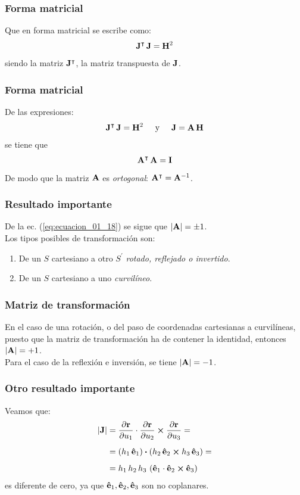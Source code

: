 \documentclass[12pt]{beamer}
\begin{document}
\begin{frame}
\frametitle{Forma matricial}
Que en forma matricial se escribe como:
\pause
\begin{align*}
\vb{J}^{\intercal} \, \vb{J} = \vb{H}^{2}
\end{align*}
siendo la matriz $\vb{J}^{\intercal}$, la matriz transpuesta de $\vb{J}$.
\end{frame}
\begin{frame}
\frametitle{Forma matricial}
De las expresiones:
\pause
\begin{align*}
\vb{J}^{\intercal} \, \vb{J} = \vb{H}^{2} \hspace{0.5cm} \mbox{y} \hspace{0.5cm} \vb{J} = \vb{A} \, \vb{H}
\end{align*}
se tiene que
\begin{align}
\vb{A}^{\intercal} \, \vb{A} = \vb{I}
\label{eq:ecuacion_01_18}
\end{align}
\pause
De modo que la matriz $\vb{A}$ es \emph{ortogonal}: $\vb{A}^{\intercal} = \vb{A}^{-1}$.
\end{frame}
\begin{frame}
\frametitle{Resultado importante}
De la ec. (\ref{eq:ecuacion_01_18}) se sigue que $\abs{\vb{A}} = \pm 1$.
\\
\bigskip
\pause
Los tipos posibles de transformación son:
\begin{enumerate}[<+->]
\item De un $S$ cartesiano a otro $S^{\prime}$ \emph{rotado, reflejado o invertido}.
\item De un $S$ cartesiano a uno \emph{curvilíneo}.
\end{enumerate}
\end{frame}
\begin{frame}
\frametitle{Matriz de transformación}
En el caso de una rotación, o del paso de coordenadas cartesianas a curvilíneas, puesto que la matriz de transformación ha de contener la identidad, entonces $\abs{\vb{A}} = +1$.
\\
\bigskip
\pause
Para el caso de la reflexión e inversión, se tiene $\abs{\vb{A}} = -1$.
\end{frame}
\begin{frame}
\frametitle{Otro resultado importante}
Veamos que:
\pause
\begin{align*}
\abs{\vb{J}} &= \pdv{\vb{r}}{u_{1}} \cdot \pdv{\vb{r}}{u_{2}} \cp \pdv{\vb{r}}{u_{3}} = \\[0.5em]
&= \left( h_{1} \, \vu{e}_{1} \right) \vdot \left( h_{2} \, \vu{e}_{2} \cp {h_{3} \, \vu{e}_{3}} \right) = \\[0.5em]
&= h_{1} \, h_{2} \, h_{3} \, \left( \vu{e}_{1} \cdot \vu{e}_{2} \cp \vu{e}_{3} \right)
\end{align*}
es diferente de cero, ya que $\vu{e}_{1}, \vu{e}_{2}, \vu{e}_{3}$ son no coplanares.
\end{frame}
\end{document}
